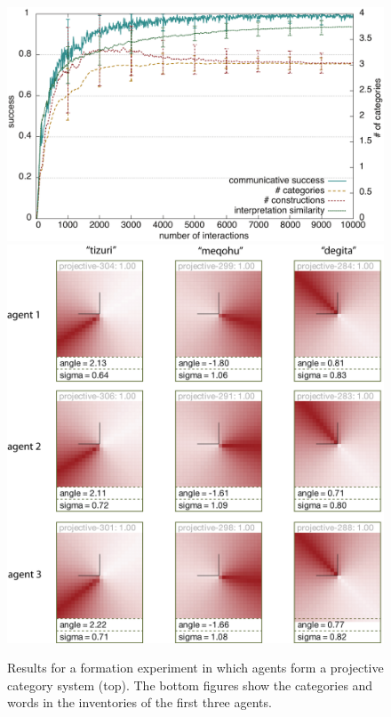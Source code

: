 \begin{figure}
\begin{center}
\includegraphics[width=0.9\columnwidth]{figs/category-formation-projective-results+categories-1}
\includegraphics[width=0.75\columnwidth]{figs/category-formation-projective-results+categories-2.png}
\end{center}
\caption[Results formation of projective category systems]{%
Results for a formation experiment in which agents form
a projective category system (top). The bottom figures show the categories and words
in the inventories of the first three agents.}
\label{f:category-formation-projective-results}
\end{figure}

